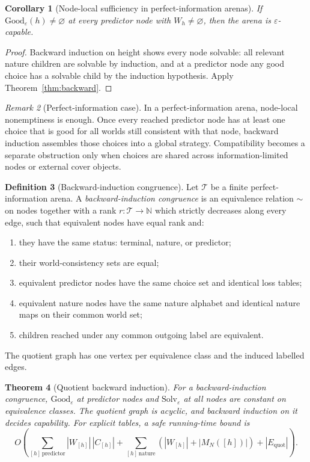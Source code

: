 \documentclass[11pt]{article}
\theoremstyle{plain}
\newtheorem{theorem}{Theorem}[section]
\newtheorem{corollary}[theorem]{Corollary}
\theoremstyle{definition}
\newtheorem{definition}[theorem]{Definition}
\theoremstyle{remark}
\newtheorem{remark}[theorem]{Remark}
\newcommand{\N}{\mathbb{N}}
\newcommand{\eps}{\varepsilon}
\begin{document}
\begin{corollary}[Node-local sufficiency in perfect-information arenas]
\label{cor:no-perfect-D}
If $\mathrm{Good}_\eps(h)\ne\varnothing$ at every predictor node with
$W_h\ne\varnothing$, then the arena is $\eps$-capable.
\end{corollary}

\begin{proof}
Backward induction on height shows every node solvable: all relevant nature
children are solvable by induction, and at a predictor node any good choice has
a solvable child by the induction hypothesis. Apply
Theorem~\ref{thm:backward}.
\end{proof}

\begin{remark}[Perfect-information case]
In a perfect-information arena, node-local nonemptiness is enough. Once every
reached predictor node has at least one choice that is good for all worlds still
consistent with that node, backward induction assembles those choices into a
global strategy. Compatibility becomes a separate obstruction only when choices
are shared across information-limited nodes or external cover objects.
\end{remark}
\begin{definition}[Backward-induction congruence]
\label{def:record-congruence}
Let $\mathcal T$ be a finite perfect-information arena. A
\emph{backward-induction congruence} is an equivalence relation $\sim$ on nodes
together with a rank $r:\mathcal T\to\N$ which strictly decreases along every
edge, such that equivalent nodes have equal rank and:
\begin{enumerate}[label=(\roman*)]
\item they have the same status: terminal, nature, or predictor;
\item their world-consistency sets are equal;
\item equivalent predictor nodes have the same choice set and identical loss
tables;
\item equivalent nature nodes have the same nature alphabet and identical
nature maps on their common world set;
\item children reached under any common outgoing label are equivalent.
\end{enumerate}
The quotient graph has one vertex per equivalence class and the induced labelled
edges.
\end{definition}

\begin{theorem}[Quotient backward induction]
\label{thm:record-quotient-bi}
For a backward-induction congruence, $\mathrm{Good}_\eps$ at predictor nodes and
$\mathrm{Solv}_\eps$ at all nodes are constant on equivalence classes. The
quotient graph is acyclic, and backward induction on it decides capability. For
explicit tables, a safe running-time bound is
\[
O\!\left(
\sum_{[h]\,\mathrm{predictor}}|W_{[h]}|\,|C_{[h]}|
+\sum_{[h]\,\mathrm{nature}}
(|W_{[h]}|+|M_N([h])|)
+|E_{\mathrm{quot}}|
\right).
\]
\end{theorem}
\end{document}
